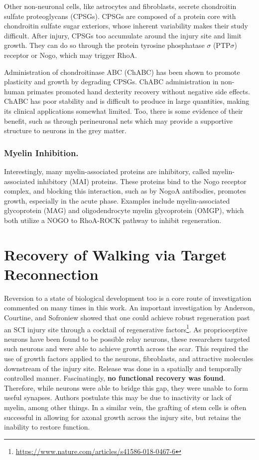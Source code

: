 Other non-neuronal cells, like astrocytes and fibroblasts, secrete chondroitin sulfate proteoglycans (CPSGs). CPSGs are composed of a protein core with chondroitin sulfate sugar exteriors, whose inherent variability makes their study difficult. After injury, CPSGs too accumulate around the injury site and limit growth.  They can do so through the protein tyrosine phosphatase $\sigma$ (PTP$\sigma$) receptor or Nogo, which may trigger RhoA.  \newline

Administration of chondroitinase ABC (ChABC) has been shown to promote plasticity and growth by degrading CPSGs. ChABC administration in non-human primates promoted hand dexterity recovery without negative side effects. ChABC has poor stability and is difficult to produce in large quantities, making its clinical applications somewhat limited. Too, there is some evidence of their benefit, such as through perineuronal nets which may provide a supportive structure to neurons in the grey matter.\newline  


\subsubsection{Myelin Inhibition.}

Interestingly, many myelin-associated proteins are inhibitory, called myelin-associated inhibitory (MAI) proteins. These proteins bind to the Nogo receptor complex, and blocking this interaction, such as by NogoA antibodies, promotes growth, especially in the acute phase. Examples include myelin-associated glycoprotein (MAG) and oligodendrocyte myelin glycoprotein (OMGP), which both utilize a NOGO to RhoA-ROCK pathway to inhibit regeneration. 

\section{Recovery of Walking via Target Reconnection}

Reversion to a state of biological development too is a core route of investigation commented on many times in this work. An important investigation by Anderson, Courtine, and Sofroniew showed that one could achieve robust regeneration past an SCI injury site through a cocktail of regenerative factors\footnote{\url{https://www.nature.com/articles/s41586-018-0467-6}}. As proprioceptive neurons have been found to be possible relay neurons, these researchers targeted such neurons and were able to achieve growth across the scar. This required the use of growth factors applied to the neurons, fibroblasts, and attractive molecules downstream of the injury site. Release was done in a spatially and temporally controlled manner. Fascinatingly, \textbf{no functional recovery was found}. Therefore, while neurons were able to bridge this gap, they were unable to form useful synapses. Authors postulate this may be due to inactivity or lack of myelin, among other things. In a similar vein, the grafting of stem cells is often successful in allowing for axonal growth across the injury site, but retains the inability to restore function.\newline

